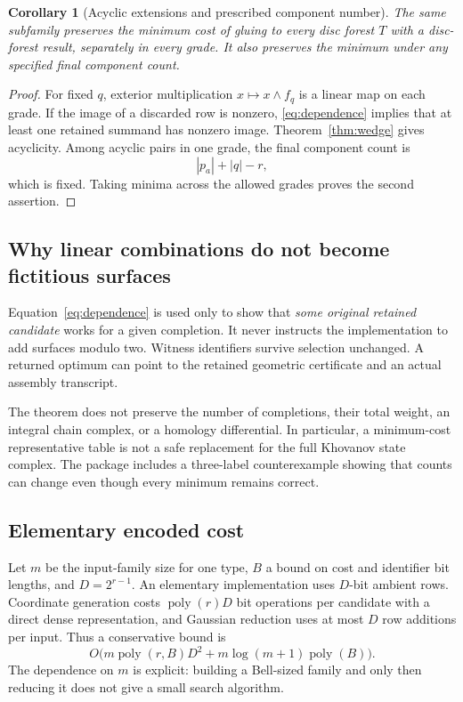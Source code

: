 \documentclass[11pt,a4paper]{article}
\newtheorem{corollary}[theorem]{Corollary}
\theoremstyle{remark}\newtheorem{remark}[theorem]{Remark}
\newcommand{\poly}{\operatorname{poly}}
\begin{document}
\begin{corollary}[Acyclic extensions and prescribed component number]\label{cor:forestrep}
The same subfamily preserves the minimum cost of gluing to every disc forest $T$ with a disc-forest result, separately in every grade. It also preserves the minimum under any specified final component count.
\end{corollary}
\begin{proof}
For fixed $q$, exterior multiplication $x\mapsto x\wedge f_q$ is a linear map on each grade. If the image of a discarded row is nonzero, \eqref{eq:dependence} implies that at least one retained summand has nonzero image. Theorem~\ref{thm:wedge} gives acyclicity. Among acyclic pairs in one grade, the final component count is
\[
 |p_a|+|q|-r,
\]
which is fixed. Taking minima across the allowed grades proves the second assertion.
\end{proof}

\subsection{Why linear combinations do not become fictitious surfaces}
Equation~\eqref{eq:dependence} is used only to show that \emph{some original retained candidate} works for a given completion. It never instructs the implementation to add surfaces modulo two. Witness identifiers survive selection unchanged. A returned optimum can point to the retained geometric certificate and an actual assembly transcript.

The theorem does not preserve the number of completions, their total weight, an integral chain complex, or a homology differential. In particular, a minimum-cost representative table is not a safe replacement for the full Khovanov state complex. The package includes a three-label counterexample showing that counts can change even though every minimum remains correct.

\subsection{Elementary encoded cost}
Let $m$ be the input-family size for one type, $B$ a bound on cost and identifier bit lengths, and $D=2^{r-1}$. An elementary implementation uses $D$-bit ambient rows. Coordinate generation costs $\poly(r)D$ bit operations per candidate with a direct dense representation, and Gaussian reduction uses at most $D$ row additions per input. Thus a conservative bound is
\begin{equation}\label{eq:localcost}
 O\bigl(m\poly(r,B)D^2+m\log(m+1)\poly(B)\bigr).
\end{equation}
The dependence on $m$ is explicit: building a Bell-sized family and only then reducing it does not give a small search algorithm.
\end{document}
